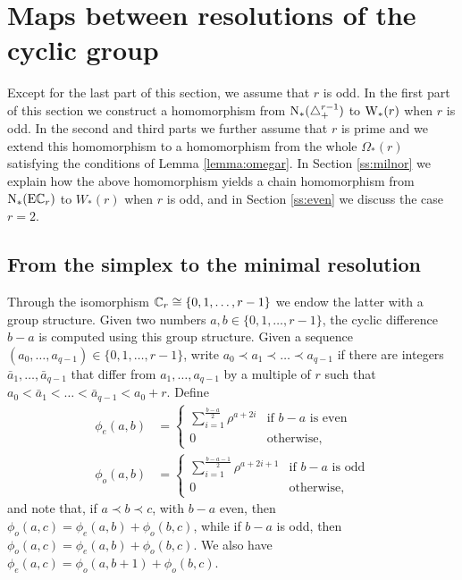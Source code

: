 
\section{Maps between resolutions of the cyclic group}\label{s:resolutions}

Except for the last part of this section, we assume that $r$ is odd. In the first part of this section we construct a homomorphism from $\operatorname{N}_*(\triangle_{+}^{r-1})$ to $\mathrm{W}_*(r)$ when $r$ is odd. In the second and third parts we further assume that $r$ is prime and we extend this homomorphism to a homomorphism from the whole $\Omega_*(r)$ satisfying the conditions of Lemma \ref{lemma:omegar}. In Section \ref{ss:milnor} we explain how the above homomorphism yields a chain homomorphism from $\operatorname{N}_*(\mathrm{E}\mathbb{C}_r)$ to $W_*(r)$ when $r$ is odd, and in Section \ref{ss:even} we discuss the case $r=2$.

\subsection{From the simplex to the minimal resolution}

Through the isomorphism $\mathbb{C}_r \cong \{0,1,\ldots,r-1\}$ we endow the latter with a group structure. Given two numbers $a,b\in \{0,1,\ldots,r-1\}$, the cyclic difference $b-a$ is computed using this group structure. Given a sequence $(a_0,\ldots,a_{q-1})\in \{0,1,\ldots,r-1\}$, write $a_0\prec a_1\prec \ldots\prec a_{q-1}$ if there are integers $\bar{a}_1,\ldots,\bar{a}_{q-1}$ that differ from $a_1,\ldots,a_{q-1}$ by a multiple of $r$ such that $a_0<\bar{a}_1<\ldots<\bar{a}_{q-1}<a_0+r$. Define
\begin{align*}
	\phi_{e}(a,b) &= \begin{cases}
		\displaystyle \sum_{i=1}^{\frac{b-a}{2}} \rho^{a+2i} & \text{if $b-a$ is even} \\
		0 & \text{otherwise,}
	\end{cases}
	\\
	\phi_{o}(a,b) &= \begin{cases}
		\displaystyle \sum_{i=1}^{\frac{b-a-1}{2}} \rho^{a+2i+1} & \text{if $b-a$ is odd} \\
		0 & \text{otherwise,}
	\end{cases}
\end{align*}
and note that, if $a\prec b\prec c$, with $b-a$ even, then $\phi_o(a,c) = \phi_e(a,b) + \phi_o(b,c)$, while if $b-a$ is odd, then $\phi_o(a,c) = \phi_e(a,b) + \phi_o(b,c)$. We also have $\phi_e(a,c) = \phi_o(a,b+1)+\phi_o(b,c)$.

